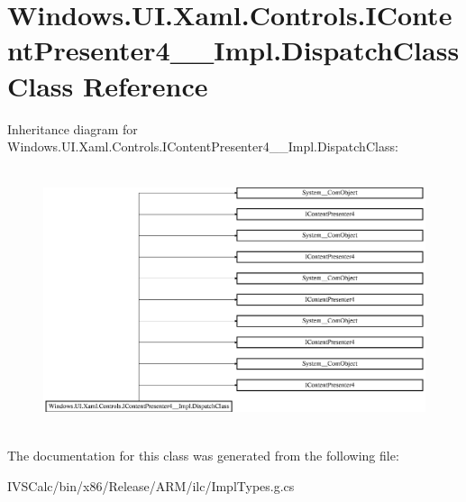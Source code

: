 \hypertarget{class_windows_1_1_u_i_1_1_xaml_1_1_controls_1_1_i_content_presenter4_____impl_1_1_dispatch_class}{}\section{Windows.\+U\+I.\+Xaml.\+Controls.\+I\+Content\+Presenter4\+\_\+\+\_\+\+Impl.\+Dispatch\+Class Class Reference}
\label{class_windows_1_1_u_i_1_1_xaml_1_1_controls_1_1_i_content_presenter4_____impl_1_1_dispatch_class}
Inheritance diagram for Windows.\+U\+I.\+Xaml.\+Controls.\+I\+Content\+Presenter4\+\_\+\+\_\+\+Impl.\+Dispatch\+Class\+:\begin{figure}[H]
\begin{center}
\leavevmode
\includegraphics[height=7.700000cm]{class_windows_1_1_u_i_1_1_xaml_1_1_controls_1_1_i_content_presenter4_____impl_1_1_dispatch_class}
\end{center}
\end{figure}


The documentation for this class was generated from the following file\+:\begin{DoxyCompactItemize}
\item 
I\+V\+S\+Calc/bin/x86/\+Release/\+A\+R\+M/ilc/Impl\+Types.\+g.\+cs\end{DoxyCompactItemize}
